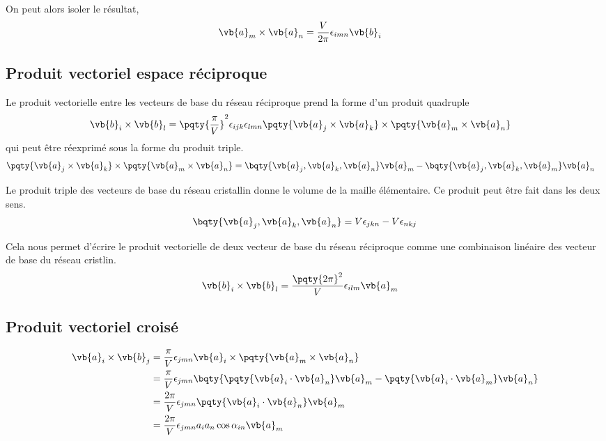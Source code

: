 On peut alors isoler le résultat,
\begin{align*}
	\vb{a}_m \times \vb{a}_n &=\frac{V}{2\pi} \epsilon_{imn} \vb{b}_i
\end{align*}


\subsection{Produit vectoriel espace réciproque}
Le produit vectorielle entre les vecteurs de base du réseau réciproque prend la forme d'un produit quadruple
\begin{align*}
	\vb{b}_i \times \vb{b}_l &= \pqty{\frac{\pi}{V}}^2 \epsilon_{ijk} \epsilon_{lmn} \pqty{\vb{a}_j \times \vb{a}_k} \times \pqty{\vb{a}_m \times \vb{a}_n}
\end{align*} qui peut être réexprimé sous la forme du produit triple.
\begin{align*}
	\pqty{\vb{a}_j \times \vb{a}_k} \times \pqty{\vb{a}_m \times \vb{a}_n} &= 
	\bqty{\vb{a}_j,\vb{a}_k,\vb{a}_n} \vb{a}_m - \bqty{\vb{a}_j,\vb{a}_k,\vb{a}_m} \vb{a}_n
\end{align*}

Le produit triple des vecteurs de base du réseau cristallin donne le volume de la maille élémentaire. Ce produit peut être fait dans les deux sens.
\begin{align*}
	\bqty{\vb{a}_j,\vb{a}_k,\vb{a}_n} = V \epsilon_{jkn} - V\epsilon_{nkj}
\end{align*}

Cela nous permet d'écrire le produit vectorielle de deux vecteur de base du réseau réciproque comme une combinaison linéaire des vecteur de base du réseau cristlin.
\begin{align*}
	\vb{b}_i \times \vb{b}_l &= \frac{\pqty{2\pi}^2}{V} \epsilon_{ilm} \vb{a}_m
\end{align*}

\subsection{Produit vectoriel croisé}
\begin{align*}
	\vb{a}_i \times \vb{b}_j &= \frac{\pi}{V}\epsilon_{jmn}\vb{a}_i \times\pqty{\vb{a}_m \times \vb{a}_n} \\
	&= \frac{\pi}{V}\epsilon_{jmn} \bqty{\pqty{\vb{a}_i \cdot \vb{a}_n}\vb{a}_m - \pqty{\vb{a}_i \cdot \vb{a}_m}\vb{a}_n} \\
	&= \frac{2\pi}{V}\epsilon_{jmn} \pqty{\vb{a}_i \cdot \vb{a}_n}\vb{a}_m \\
	&= \frac{2\pi}{V}\epsilon_{jmn} a_ia_n\cos\alpha_{in}\vb{a}_m
\end{align*}

